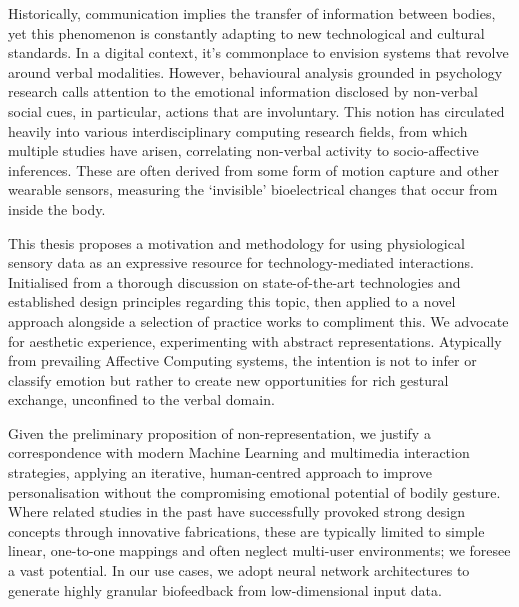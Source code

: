

Historically, communication implies the transfer of information between bodies, yet this phenomenon is constantly adapting to new technological and cultural standards. In a digital context, it’s commonplace to envision systems that revolve around verbal modalities. However, behavioural analysis grounded in psychology research calls attention to the emotional information disclosed by non-verbal social cues, in particular, actions that are involuntary. This notion has circulated heavily into various interdisciplinary computing research fields, from which multiple studies have arisen, correlating non-verbal activity to socio-affective inferences. These are often derived from some form of motion capture and other wearable sensors, measuring the ‘invisible’ bioelectrical changes that occur from inside the body.

This thesis proposes a motivation and methodology for using physiological sensory data as an expressive resource for technology-mediated interactions. Initialised from a thorough discussion on state-of-the-art technologies and established design principles regarding this topic, then applied to a novel approach alongside a selection of practice works to compliment this. We advocate for aesthetic experience, experimenting with abstract representations. Atypically from prevailing Affective Computing systems, the intention is not to infer or classify emotion but rather to create new opportunities for rich gestural exchange, unconfined to the verbal domain.

Given the preliminary proposition of non-representation, we justify a correspondence with modern Machine Learning and multimedia interaction strategies, applying an iterative, human-centred approach to improve personalisation without the compromising emotional potential of bodily gesture. Where related studies in the past have successfully provoked strong design concepts through innovative fabrications, these are typically limited to simple linear, one-to-one mappings and often neglect multi-user environments; we foresee a vast potential. In our use cases, we adopt neural network architectures to generate highly granular biofeedback from low-dimensional input data.

